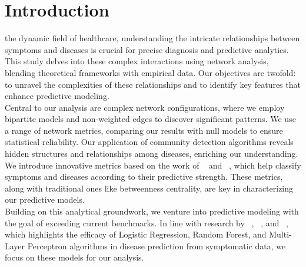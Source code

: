 \section{Introduction}

 the dynamic field of healthcare, understanding the intricate relationships between symptoms and diseases is crucial
for precise diagnosis and predictive analytics. This study delves into these complex interactions using network analysis,
blending theoretical frameworks with empirical data. Our objectives are twofold: to unravel the complexities of these
relationships and to identify key features that enhance predictive modeling.\\
Central to our analysis are complex network configurations, where we employ bipartite models and non-weighted edges to discover significant patterns.
We use a range of network metrics, comparing our results with null models to ensure statistical reliability. Our application of community detection
algorithms reveals hidden structures and relationships among diseases, enriching our understanding.\\
We introduce innovative metrics based on the work of \citeauthor{Hidalgo_2009}~\cite{Hidalgo_2009} and \citeauthor{Hidalgo_2007}~\cite{Hidalgo_2007},
which help classify symptoms and diseases according to their predictive strength. These metrics, along with traditional ones like betweenness centrality,
are key in characterizing our predictive models.\\
Building on this analytical groundwork, we venture into predictive modeling with the goal of exceeding current benchmarks.
In line with research by \citeauthor{Kohli}~\cite{Kohli}, \citeauthor{Singh}~\cite{Singh}, and \citeauthor{Uddin2019Dec}~\cite{Uddin2019Dec},
which highlights the efficacy of Logistic Regression, Random Forest, and Multi-Layer Perceptron algorithms in disease prediction from symptomatic data,
we focus on these models for our analysis.